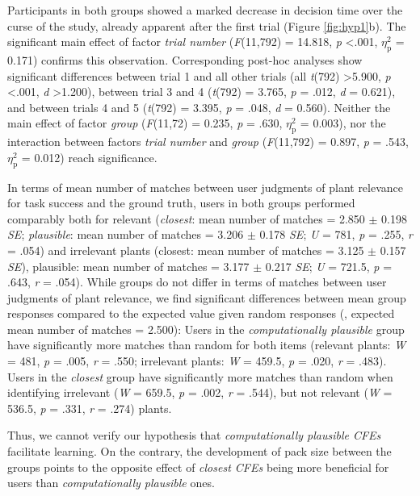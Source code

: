 Participants in both groups showed a marked decrease in decision time over the curse of the study, already apparent after the first trial (Figure \ref{fig:hyp1}b).
The significant main effect of factor \textit{trial number} (\textit{F}(11,792) = 14.818, \textit{p} \textless .001, $\eta_{\text{p}}^{2}$ = 0.171) confirms this observation.
Corresponding post-hoc analyses show significant differences between trial 1 and all other trials (all \textit{t}(792) \textgreater 5.900, \textit{p} \textless .001, \textit{d} \textgreater 1.200), between trial 3 and 4 (\textit{t}(792) = 3.765, \textit{p} = .012, \textit{d} = 0.621), and between trials 4 and 5 (\textit{t}(792) = 3.395, \textit{p} = .048, \textit{d} = 0.560).
Neither the main effect of factor \textit{group} (\textit{F}(11,72) = 0.235, \textit{p} = .630, $\eta_{\text{p}}^{2}$ = 0.003), nor the interaction between factors \textit{trial number} and \textit{group} (\textit{F}(11,792) = 0.897, \textit{p} = .543, $\eta_{\text{p}}^{2}$ = 0.012) reach significance.

In terms of mean number of matches between user judgments of plant relevance for task success and the ground truth, users in both groups performed comparably both for relevant 
(\textit{closest}: mean number of matches = 2.850 $\pm$ 0.198 \textit{SE}; \textit{plausible}: mean number of matches = 3.206 $\pm$ 0.178 \textit{SE}; \textit{U} = 781, \textit{p} = .255, \textit{r} = .054)
and irrelevant plants (closest: mean number of matches = 3.125 $\pm$ 0.157 \textit{SE}), plausible: mean number of matches = 3.177 $\pm$ 0.217 \textit{SE}; \textit{U} = 721.5, \textit{p} = .643, \textit{r} = .054).
While groups do not differ in terms of matches between user judgments of plant relevance, we find significant differences between mean group responses compared to the expected value given random responses (\ie, expected mean number of matches = 2.500): 
Users in the \textit{computationally plausible} group have significantly more matches than random for both items (relevant plants: \textit{W} = 481, \textit{p} = .005, \textit{r} = .550; irrelevant plants: \textit{W} = 459.5, \textit{p} = .020, \textit{r} = .483).
Users in the \textit{closest} group have significantly more matches than random when identifying irrelevant (\textit{W} = 659.5, \textit{p} = .002, \textit{r} = .544), but not relevant (\textit{W} = 536.5, \textit{p} = .331, \textit{r} = .274) plants.

Thus, we cannot verify our hypothesis that \textit{computationally plausible \glspl{CFE}} facilitate learning. On the contrary, the development of pack size between the groups points to the opposite effect of \textit{closest \glspl{CFE}} being more beneficial for users than \textit{computationally plausible} ones.

